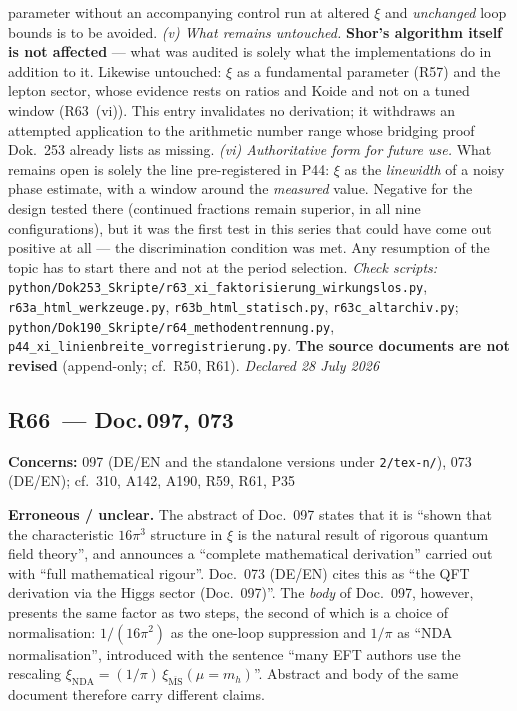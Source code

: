 parameter without an accompanying control run at altered $\xi$ and
\emph{unchanged} loop bounds is to be avoided.
\emph{(v) What remains untouched.} \textbf{Shor's algorithm itself is not
affected} --- what was audited is solely what the implementations do in
addition to it. Likewise untouched: $\xi$ as a fundamental parameter
(R57) and the lepton sector, whose evidence rests on ratios and Koide and
not on a tuned window (R63~(vi)). This entry invalidates no derivation;
it withdraws an attempted application to the arithmetic number range
whose bridging proof Dok.~253 already lists as missing.
\emph{(vi) Authoritative form for future use.} What remains open is
solely the line pre-registered in P44: $\xi$ as the \emph{linewidth} of a
noisy phase estimate, with a window around the \emph{measured} value.
Negative for the design tested there (continued fractions remain
superior, in all nine configurations), but it was the first test in this
series that could have come out positive at all --- the discrimination
condition was met. Any resumption of the topic has to start there and not
at the period selection.
\emph{Check scripts:}
\texttt{python/\allowbreak Dok253\_\allowbreak Skripte/\allowbreak r63\_\allowbreak xi\_\allowbreak faktorisierung\_\allowbreak wirkungslos.py},
\texttt{r63a\_\allowbreak html\_\allowbreak werkzeuge.py},
\texttt{r63b\_\allowbreak html\_\allowbreak statisch.py},
\texttt{r63c\_\allowbreak altarchiv.py};
\texttt{python/\allowbreak Dok190\_\allowbreak Skripte/\allowbreak r64\_\allowbreak methodentrennung.py},
\texttt{p44\_\allowbreak xi\_\allowbreak linienbreite\_\allowbreak vorregistrierung.py}.
\textbf{The source documents are not revised}
(append-only; cf.\ R50, R61). \emph{Declared 28 July 2026}

\medskip

\subsection*{R66~--- Doc.\,097, 073}

\noindent\textbf{Concerns:} 097 (DE/EN and the standalone versions under
\texttt{2/tex-n/}), 073 (DE/EN); cf.\ 310, A142, A190, R59, R61, P35

\smallskip\noindent\textbf{Erroneous / unclear.}\quad
The abstract of Doc.~097 states that it is \enquote{shown that the
characteristic $16\pi^3$ structure in $\xi$ is the natural result of
rigorous quantum field theory}, and announces a \enquote{complete
mathematical derivation} carried out with \enquote{full mathematical
rigour}. Doc.~073 (DE/EN) cites this as \enquote{the QFT derivation via
the Higgs sector (Doc.~097)}. The \emph{body} of Doc.~097, however,
presents the same factor as two steps, the second of which is a choice of
normalisation: $1/(16\pi^2)$ as the one-loop suppression and $1/\pi$ as
\enquote{NDA normalisation}, introduced with the sentence \enquote{many
EFT authors use the rescaling
$\xi_\text{NDA} = (1/\pi)\,\xi_{\overline{\text{MS}}}(\mu = m_h)$}.
Abstract and body of the same document therefore carry different claims.

